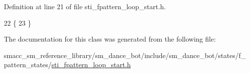 Definition at line 21 of file sti\+\_\+fpattern\+\_\+loop\+\_\+start.\+h.


\begin{DoxyCode}
22   \{
23   \}
\end{DoxyCode}


The documentation for this class was generated from the following file\+:\begin{DoxyCompactItemize}
\item 
smacc\+\_\+sm\+\_\+reference\+\_\+library/sm\+\_\+dance\+\_\+bot/include/sm\+\_\+dance\+\_\+bot/states/f\+\_\+pattern\+\_\+states/\hyperlink{include_2sm__dance__bot_2states_2f__pattern__states_2sti__fpattern__loop__start_8h}{sti\+\_\+fpattern\+\_\+loop\+\_\+start.\+h}\end{DoxyCompactItemize}
